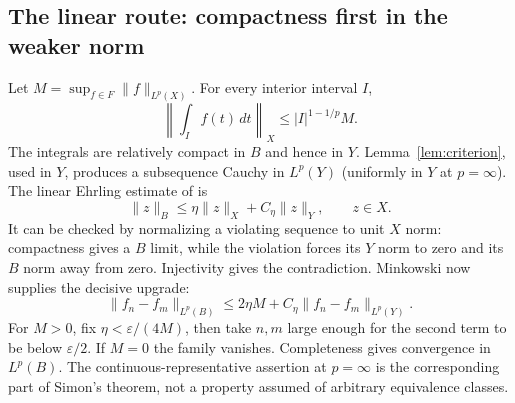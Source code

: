 \documentclass[12pt,reqno]{amsart}
\begin{document}
\subsection{The linear route: compactness first in the weaker norm}
Let $M=\sup_{f\in F}\|f\|_{L^p(X)}$. For every interior interval $I$,
\[
\left\|\int_I f(t)\,dt\right\|_X\le |I|^{1-1/p}M.
\]
The integrals are relatively compact in $B$ and hence in $Y$. Lemma~\ref{lem:criterion}, used in $Y$, produces a subsequence Cauchy in $L^p(Y)$ (uniformly in $Y$ at $p=\infty$).
The linear Ehrling estimate of \cite[Lemma 8, pp.~84--85]{S-simon} is
\[
\|z\|_B\le\eta\|z\|_X+C_\eta\|z\|_Y,\qquad z\in X.
\]
It can be checked by normalizing a violating sequence to unit $X$ norm: compactness gives a $B$ limit, while the violation forces its $Y$ norm to zero and its $B$ norm away from zero. Injectivity gives the contradiction.
Minkowski now supplies the decisive upgrade:
\begin{equation}\label{eq:linearupgrade}
\|f_n-f_m\|_{L^p(B)}\le 2\eta M+C_\eta\|f_n-f_m\|_{L^p(Y)}.
\end{equation}
For $M>0$, fix $\eta<\varepsilon/(4M)$, then take $n,m$ large enough for the second term to be below $\varepsilon/2$. If $M=0$ the family vanishes. Completeness gives convergence in $L^p(B)$. The continuous-representative assertion at $p=\infty$ is the corresponding part of Simon's theorem, not a property assumed of arbitrary equivalence classes.
\end{document}
